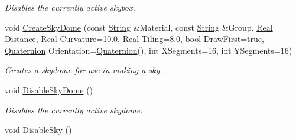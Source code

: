 \begin{DoxyCompactItemize}
\begin{DoxyCompactList}\small\item\em Disables the currently active skybox. \item\end{DoxyCompactList}\item 
void \hyperlink{classphys_1_1SceneManager_a965bec06f491a619101c3142ca1eb47c}{CreateSkyDome} (const \hyperlink{namespacephys_aa03900411993de7fbfec4789bc1d392e}{String} \&Material, const \hyperlink{namespacephys_aa03900411993de7fbfec4789bc1d392e}{String} \&Group, \hyperlink{namespacephys_af7eb897198d265b8e868f45240230d5f}{Real} Distance, \hyperlink{namespacephys_af7eb897198d265b8e868f45240230d5f}{Real} Curvature=10.0, \hyperlink{namespacephys_af7eb897198d265b8e868f45240230d5f}{Real} Tiling=8.0, bool DrawFirst=true, \hyperlink{classphys_1_1Quaternion}{Quaternion} Orientation=\hyperlink{classphys_1_1Quaternion}{Quaternion}(), int XSegments=16, int YSegments=16)
\begin{DoxyCompactList}\small\item\em Creates a skydome for use in making a sky. \item\end{DoxyCompactList}\item 
void \hyperlink{classphys_1_1SceneManager_a11bf15ca8c7d758ee50e423ad03d2625}{DisableSkyDome} ()
\begin{DoxyCompactList}\small\item\em Disables the currently active skydome. \item\end{DoxyCompactList}\item 
\hypertarget{classphys_1_1SceneManager_a929da26f1fcdbe98484b7162dcf2d16f}{
void \hyperlink{classphys_1_1SceneManager_a929da26f1fcdbe98484b7162dcf2d16f}{DisableSky} ()}
\label{classphys_1_1SceneManager_a929da26f1fcdbe98484b7162dcf2d16f}


\end{DoxyCompactItemize}
